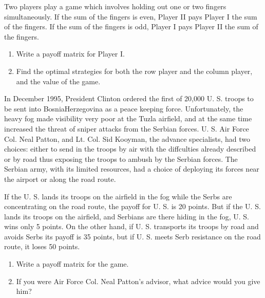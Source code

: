 \begin{puzzle}
    Two players play a game which involves holding out one or two fingers simultaneously. If the sum of the fingers is even, Player II pays Player I the sum of the fingers. If the sum of the fingers is odd, Player I pays Player II the sum of the fingers.

    \begin{enumerate}
        \item Write a payoff matrix for Player I.
        \item Find the optimal strategies for both the row player and the column player, and the value of the game.
    \end{enumerate}
\end{puzzle}

\begin{puzzle}
    In December 1995, President Clinton ordered the first of 20,000 U. S. troops to be sent into BosniaHerzegovina as a peace keeping force. Unfortunately, the heavy fog made visibility very poor at the Tuzla airfield, and at the same time increased the threat of sniper attacks from the Serbian forces. U. S. Air Force Col. Neal Patton, and Lt. Col. Sid Kooyman, the advance specialists, had two choices: either to send in the troops by air with the diffculties already described or by road thus exposing the troops to ambush by the Serbian forces. The Serbian army, with its limited resources, had a choice of deploying its forces near the airport or along the road route.

    If the U. S. lands its troops on the airfield in the fog while the Serbs are concentrating on the road route, the payoff for U. S. is 20 points. But if the U. S. lands its troops on the airfield, and Serbians are there hiding in the fog, U. S. wins only 5 points. On the other hand, if U. S. transports its troops by road and avoids Serbs its payoff is 35 points, but if U. S. meets Serb resistance on the road route, it loses 50 points.
    \begin{enumerate}
        \item Write a payoff matrix for the game.
        \item If you were Air Force Col. Neal Patton's advisor, what advice would you give him?
    \end{enumerate}
\end{puzzle}